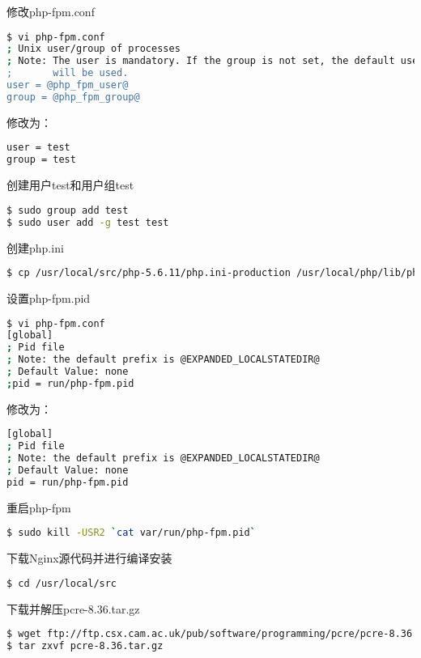修改php-fpm.conf


\begin{lstlisting}[language=bash]
$ vi php-fpm.conf
; Unix user/group of processes
; Note: The user is mandatory. If the group is not set, the default user's group
;       will be used.
user = @php_fpm_user@
group = @php_fpm_group@
\end{lstlisting}

修改为：


\begin{lstlisting}[language=bash]
user = test
group = test
\end{lstlisting}

创建用户test和用户组test


\begin{lstlisting}[language=bash]
$ sudo group add test
$ sudo user add -g test test
\end{lstlisting}

创建php.ini

\begin{lstlisting}[language=bash]
$ cp /usr/local/src/php-5.6.11/php.ini-production /usr/local/php/lib/php.ini
\end{lstlisting}

设置php-fpm.pid

\begin{lstlisting}[language=bash]
$ vi php-fpm.conf
[global]
; Pid file
; Note: the default prefix is @EXPANDED_LOCALSTATEDIR@
; Default Value: none
;pid = run/php-fpm.pid
\end{lstlisting}

修改为：

\begin{lstlisting}[language=bash]
[global]
; Pid file
; Note: the default prefix is @EXPANDED_LOCALSTATEDIR@
; Default Value: none
pid = run/php-fpm.pid
\end{lstlisting}

重启php-fpm


\begin{lstlisting}[language=bash]
$ sudo kill -USR2 `cat var/run/php-fpm.pid`
\end{lstlisting}

下载Nginx源代码并进行编译安装


\begin{lstlisting}[language=bash]
$ cd /usr/local/src
\end{lstlisting}


下载并解压pcre-8.36.tar.gz

\begin{lstlisting}[language=bash]
$ wget ftp://ftp.csx.cam.ac.uk/pub/software/programming/pcre/pcre-8.36.tar.gz
$ tar zxvf pcre-8.36.tar.gz
\end{lstlisting}


